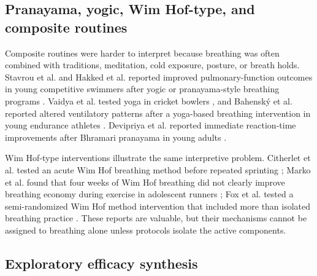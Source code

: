 \documentclass[12pt,a4paper]{article}
\begin{document}
\subsection{Pranayama, yogic, Wim Hof-type, and composite routines}
Composite routines were harder to interpret because breathing was often combined with traditions, meditation, cold exposure, posture, or breath holds. Stavrou et al. and Hakked et al. reported improved pulmonary-function outcomes in young competitive swimmers after yogic or pranayama-style breathing programs \parencite{stavrou_v_and_toubekis_ag_and_karetsi_e_changes_2015,hakked_cs_and_balakrishnan_r_and_krishnamurthy_mn_yogic_2017}. Vaidya et al. tested yoga in cricket bowlers \parencite{vaidya_ss_and_agarwal_b_and_singh_y_and_mullerpatan_r_effect_2021}, and Bahenský et al. reported altered ventilatory patterns after a yoga-based breathing intervention in young endurance athletes \parencite{bahensky_p_and_bunc_v_and_malatova_r_and_marko_d_and_grosicki_gj_and_schuster_j_impact_2021}. Devipriya et al. reported immediate reaction-time improvements after Bhramari pranayama in young adults \parencite{t_d_and_r_d_and_r_a_s_and_r_p_and_k_n_gk_evaluation_2026}.

Wim Hof-type interventions illustrate the same interpretive problem. Citherlet et al. tested an acute Wim Hof breathing method before repeated sprinting \parencite{citherlet_t_and_crettaz_von_roten_f_and_kayser_b_and_guex_k_acute_2021}; Marko et al. found that four weeks of Wim Hof breathing did not clearly improve breathing economy during exercise in adolescent runners \parencite{marko_d_and_bahensky_p_and_bunc_v_and_grosicki_gj_and_vondrasek_jd_does_2022}; Fox et al. tested a semi-randomized Wim Hof method intervention that included more than isolated breathing practice \parencite{fox_n_and_biddell_h_and_king_j_semi-randomised_2025}. These reports are valuable, but their mechanisms cannot be assigned to breathing alone unless protocols isolate the active components.

\subsection{Exploratory efficacy synthesis}

\end{document}
